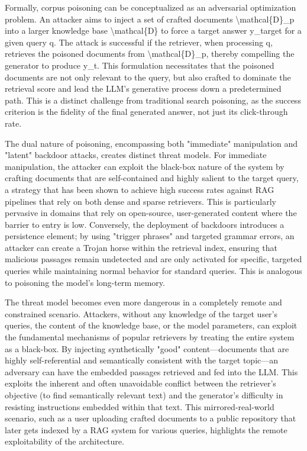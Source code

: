 \documentclass[11pt,a4paper]{article}
\begin{document}
Formally, corpus poisoning can be conceptualized as an adversarial optimization problem. An attacker aims to inject a set of crafted documents \textbackslash{}mathcal\{D\}\_p into a larger knowledge base \textbackslash{}mathcal\{D\} to force a target answer y\_target for a given query q. The attack is successful if the retriever, when processing q, retrieves the poisoned documents from \textbackslash{}mathcal\{D\}\_p, thereby compelling the generator to produce y\_t. This formulation necessitates that the poisoned documents are not only relevant to the query, but also crafted to dominate the retrieval score and lead the LLM's generative process down a predetermined path. This is a distinct challenge from traditional search poisoning, as the success criterion is the fidelity of the final generated answer, not just its click-through rate.

The dual nature of poisoning, encompassing both "immediate" manipulation and "latent" backdoor attacks, creates distinct threat models. For immediate manipulation, the attacker can exploit the black-box nature of the system by crafting documents that are self-contained and highly salient to the target query, a strategy that has been shown to achieve high success rates against RAG pipelines that rely on both dense and sparse retrievers. This is particularly pervasive in domains that rely on open-source, user-generated content where the barrier to entry is low. Conversely, the deployment of backdoors introduces a persistence element; by using "trigger phrases" and targeted grammar errors, an attacker can create a Trojan horse within the retrieval index, ensuring that malicious passages remain undetected and are only activated for specific, targeted queries while maintaining normal behavior for standard queries. This is analogous to poisoning the model's long-term memory.

The threat model becomes even more dangerous in a completely remote and constrained scenario. Attackers, without any knowledge of the target user's queries, the content of the knowledge base, or the model parameters, can exploit the fundamental mechanisms of popular retrievers by treating the entire system as a black-box. By injecting synthetically "good" content---documents that are highly self-referential and semantically consistent with the target topic---an adversary can have the embedded passages retrieved and fed into the LLM. This exploits the inherent and often unavoidable conflict between the retriever's objective (to find semantically relevant text) and the generator's difficulty in resisting instructions embedded within that text. This mirrored-real-world scenario, such as a user uploading crafted documents to a public repository that later gets indexed by a RAG system for various queries, highlights the remote exploitability of the architecture.
\end{document}
